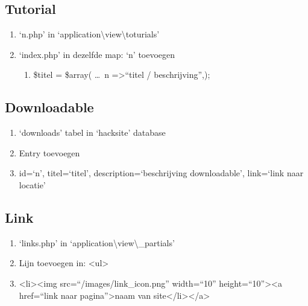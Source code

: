 \subsection{Tutorial} 
\begin{enumerate}
\item `n.php' in `application\textbackslash view\textbackslash toturials'
\item `index.php' in dezelfde map: `n' toevoegen
	\begin{enumerate}
	\item \$titel = \$array( \ldots ~n =\textgreater ``titel / beschrijving'',);
	\end{enumerate}
\end{enumerate}

\subsection{Downloadable}
\begin{enumerate}
\item `downloads' tabel in `hacksite' database
\item Entry toevoegen
\item id=`n', titel=`titel', description=`beschrijving downloadable', link=`link naar locatie'
\end{enumerate}

\subsection{Link}
\begin{enumerate}
\item `links.php' in `application\textbackslash view\textbackslash \_partials'
\item Lijn toevoegen in: \textless ul\textgreater
\item \textless li\textgreater \textless img src=``/images/link\_icon.png'' width=``10'' height=``10''\textgreater \textless a href=``link naar pagina''\textgreater naam van site\textless /li\textgreater \textless/a\textgreater 
\end{enumerate}